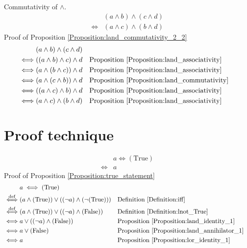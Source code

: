 \begin{prop}
\label{Proposition:land_commutativity_2_2}
Commutativity of $\land$.
\begin{align*}
& (a \land b) \land (c \land d) \\
\iff & (a \land c) \land (b \land d)
\end{align*}
Proof of Proposition \ref{Proposition:land_commutativity_2_2}
\begin{align*}
& (a \land b) \land (c \land d) \\
\iff & ((a \land b) \land c) \land d
& & \text{Proposition \ref{Proposition:land_associativity}} \\
\iff & (a \land (b \land c)) \land d
& & \text{Proposition \ref{Proposition:land_associativity}} \\
\iff & (a \land (c \land b)) \land d
& & \text{Proposition \ref{Proposition:land_commutativity}} \\
\iff & ((a \land c) \land b) \land d
& & \text{Proposition \ref{Proposition:land_associativity}} \\
\iff & (a \land c) \land (b \land d)
& & \text{Proposition \ref{Proposition:land_associativity}} \\
\end{align*}
\end{prop}

\section{Proof technique}
\begin{prop}
\label{Proposition:true_statement}
\begin{align*}
& a \iff (\text{True}) \\
\iff & a
\end{align*}
Proof of Proposition \ref{Proposition:true_statement}
\begin{align*}
& a \iff (\text{True}) \\
\overset{\operatorname{def}}{\iff} & (a \land (\text{True})) \lor ((\lnot a) \land (\lnot (\text{True})))
& & \text{Definition \ref{Definition:iff}} \\
\overset{\operatorname{def}}{\iff} & (a \land (\text{True})) \lor ((\lnot a) \land (\text{False}))
& & \text{Definition \ref{Definition:lnot_True}} \\
\iff & a \lor ((\lnot a) \land (\text{False}))
& & \text{Proposition \ref{Proposition:land_identity_1}} \\
\iff & a \lor (\text{False})
& & \text{Proposition \ref{Proposition:land_annihilator_1}} \\
\iff & a
& & \text{Proposition \ref{Proposition:lor_identity_1}} \\
\end{align*}
\end{prop}

